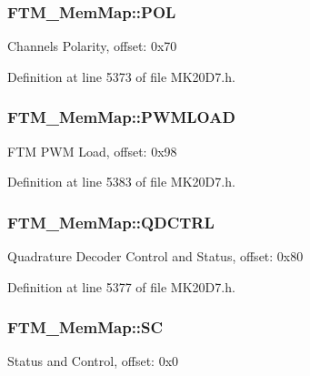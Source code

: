 \subsubsection[{\texorpdfstring{P\+OL}{POL}}]{ F\+T\+M\+\_\+\+Mem\+Map\+::\+P\+OL}\hypertarget{struct_f_t_m___mem_map_a3a9de308929bca0a0a9155f4222aadae}{}\label{struct_f_t_m___mem_map_a3a9de308929bca0a0a9155f4222aadae}
Channels Polarity, offset\+: 0x70 

Definition at line 5373 of file M\+K20\+D7.\+h.

\subsubsection[{\texorpdfstring{P\+W\+M\+L\+O\+AD}{PWMLOAD}}]{ F\+T\+M\+\_\+\+Mem\+Map\+::\+P\+W\+M\+L\+O\+AD}\hypertarget{struct_f_t_m___mem_map_a84f64d9ce40acaa01380dab13bc5b5ea}{}\label{struct_f_t_m___mem_map_a84f64d9ce40acaa01380dab13bc5b5ea}
F\+TM P\+WM Load, offset\+: 0x98 

Definition at line 5383 of file M\+K20\+D7.\+h.

\subsubsection[{\texorpdfstring{Q\+D\+C\+T\+RL}{QDCTRL}}]{ F\+T\+M\+\_\+\+Mem\+Map\+::\+Q\+D\+C\+T\+RL}\hypertarget{struct_f_t_m___mem_map_a88687af53ea301e8e0c793d8539dd4dd}{}\label{struct_f_t_m___mem_map_a88687af53ea301e8e0c793d8539dd4dd}
Quadrature Decoder Control and Status, offset\+: 0x80 

Definition at line 5377 of file M\+K20\+D7.\+h.

\subsubsection[{\texorpdfstring{SC}{SC}}]{ F\+T\+M\+\_\+\+Mem\+Map\+::\+SC}\hypertarget{struct_f_t_m___mem_map_a4b1c487fee64f94a40d5f170865fe466}{}\label{struct_f_t_m___mem_map_a4b1c487fee64f94a40d5f170865fe466}
Status and Control, offset\+: 0x0 

